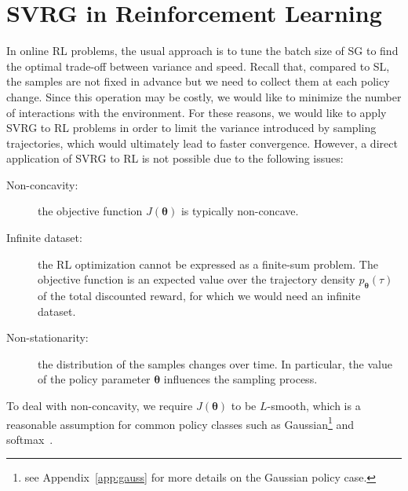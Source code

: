 \documentclass{article}
\makeatletter
\theoremstyle{remark}
\theoremstyle{definition}
\DeclareRobustCommand{\eg}{e.g.,\@\xspace}
\newcommand{\todopir}[1]{\todo[color=blued, inline]{\small #1}}
\newcommand{\vtheta}{\boldsymbol{\theta}}
\makeatother
\begin{document}
\section{SVRG in Reinforcement Learning}\label{sec:alg}
In online RL problems, the usual approach is to tune the batch size of SG to find the optimal trade-off between variance and speed.
Recall that, compared to SL, the samples are not fixed in advance but we need to collect them at each policy change.
Since this operation may be costly, we would like to minimize the number of interactions with the environment.
For these reasons, we would like to apply SVRG to RL problems in order to limit the variance introduced by sampling trajectories, which would ultimately lead to faster convergence.
However, a direct application of SVRG to RL is not possible due to the following issues:
\begin{description}
        \item[Non-concavity:] the objective function $J(\vtheta)$ is typically non-concave.
        \item[Infinite dataset:] the RL optimization cannot be expressed as a finite-sum problem. The objective function is an expected value over the trajectory density $p_{\vtheta}(\tau)$ of the total discounted reward, for which we would need an infinite dataset.
        \item[Non-stationarity:] the distribution of the samples changes over time. In particular, the value of the policy parameter $\vtheta$ influences the sampling process.
\end{description}
To deal with non-concavity, we require $J(\vtheta)$ to be $L$-smooth, which is a reasonable assumption for common policy classes such as Gaussian\footnote{see Appendix~\ref{app:gauss} for more details on the Gaussian policy case.} and softmax~\citep[\eg][]{Furmston2012unifying,pirotta2015lipschitz}.
\end{document}
